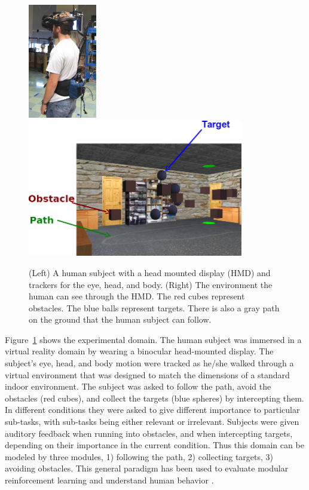 \begin{figure}[h]
\centering
\includegraphics[height=5cm]{human.jpg}
\includegraphics[height=6cm]{env.png}
\caption{(Left) A human subject with a head mounted display (HMD) and trackers
for the eye, head, and body.  (Right) The environment the human can see through
the HMD.  The red cubes represent obstacles. The blue balls represent targets.
There is also a gray path on the ground that the human subject can follow.}
\label{fig:avatar}
\end{figure}

Figure~\ref{fig:avatar} shows the experimental domain. The
human subject was immersed in a virtual reality domain by wearing a binocular head-mounted display.
The subject's eye, head, and body motion were tracked as he/she walked through a
virtual environment that was designed to match the dimensions of a standard indoor
environment. The subject was asked to follow the path, avoid the obstacles (red
cubes), and collect the targets (blue spheres) by intercepting them. In
different conditions they were asked to give different importance to particular
sub-tasks, with sub-tasks being either relevant or irrelevant. Subjects were
given auditory feedback when running into obstacles, and when intercepting
targets, depending on their importance in the current condition. Thus this
domain can be modeled by three modules, 1) following the path, 2) collecting targets, 3)
avoiding obstacles.  This general paradigm has been used to evaluate modular
reinforcement learning \cite{Rothkopf12Infer, rothkopf2013modular} and understand human behavior
\cite{Tong2014}.

